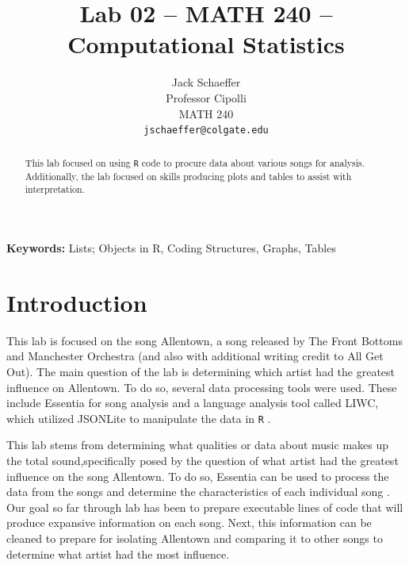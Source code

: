 \documentclass{article}\usepackage[]{graphicx}\usepackage[]{xcolor}
\begin{document}
\vspace{-1in}
\title{Lab 02 -- MATH 240 -- Computational Statistics}

\author{
  Jack Schaeffer \\
  Professor Cipolli \\
  MATH 240 \\
  {\tt jschaeffer@colgate.edu}
}

\date{}

\maketitle

\begin{multicols}{2}
\begin{abstract}
This lab focused on using \texttt{R} code to procure data about various songs for analysis. Additionally, the lab focused on skills producing plots and tables to assist with interpretation.
\end{abstract}

\noindent \textbf{Keywords:} Lists; Objects in R, Coding Structures, Graphs, Tables

\section{Introduction}
This lab is focused on the song Allentown, a song released by The Front Bottoms and Manchester Orchestra (and also with additional writing credit to All Get Out). The main question of the lab is determining which artist had the greatest influence on Allentown. To do so, several data processing tools were used. These include Essentia for song analysis and a language analysis tool called LIWC, which utilized JSONLite to manipulate the data in \texttt{R} \citep{essentia} \citep{jsonlite}.

This lab stems from determining what qualities or data about music makes up the total sound,specifically posed by the question of what artist had the greatest influence on the song Allentown. To do so, Essentia can be used to process the data from the songs and determine the characteristics of each individual song \citep{essentia}. Our goal so far through lab has been to prepare executable lines of code that will produce expansive information on each song. Next, this information can be cleaned to prepare for isolating Allentown and comparing it to other songs to determine what artist had the most influence.



\end{multicols}
\end{document}
